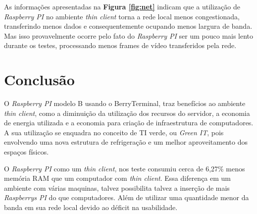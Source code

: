 \documentclass[
	12pt,				%
	openright,			%
	twoside,			%
	a4paper,			%
	chapter=TITLE,		%
	english,			%
	brazil				%
	]{abntex2}
\begin{document}
As informações apresentadas na \textbf{Figura \ref{fig:net}} indicam que a utilização de \textit{Raspberry PI} no ambiente \textit{thin client} torna a rede local menos congestionada, transferindo menos dados e consequentemente ocupando menos largura de banda. Mas isso provavelmente ocorre pelo fato do \textit{Raspberry PI} ser um pouco mais lento durante os testes, processando menos frames de vídeo transferidos pela rede.









\section{Conclusão}

O \textit{Raspberry PI} modelo B usando o BerryTerminal, traz benefícios ao ambiente \textit{thin client}, como a diminuição da utilização dos recursos do servidor, a economia de energia utilizada e a economia para criação de infraestrutura de computadores. A sua utilização se enquadra no conceito de TI verde, ou \textit{Green IT}, pois envolvendo uma nova estrutura de refrigeração e um melhor aproveitamento dos espaços físicos. 

O \textit{Raspberry PI} como um \textit{thin client}, nos teste consumiu cerca de 6,27\% menos memória RAM que um computador com \textit{thin client}. Essa diferença em um ambiente com várias maquinas, talvez possibilita talvez a inserção de mais \textit{Raspberrys PI} do que computadores. Além de utilizar uma quantidade menor da banda em sua rede local devido ao déficit na usabilidade.
\end{document}
